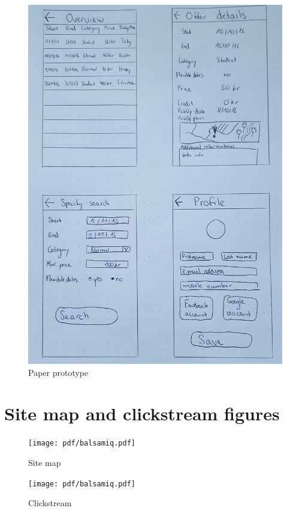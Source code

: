 \documentclass[11pt,twoside,a4paper]{report}
\begin{document}
\begin{appendices}
\begin{figure}
	\centering
	\includegraphics[width=\textwidth]{jpg/paper-prototype-2.jpg}
	\caption{Paper prototype}
	\label{figure:paper-prototype-2}
\end{figure}

\chapter{Site map and clickstream figures}
\newpage

\begin{figure}
	\centering
	\texttt{[image: pdf/balsamiq.pdf]}
	\caption{Site map}
	\label{figure:site-map}
\end{figure}

\begin{figure}
	\centering
	\texttt{[image: pdf/balsamiq.pdf]}
	\caption{Clickstream}
	\label{figure:clickstream}
\end{figure}


\end{appendices}
\end{document}
